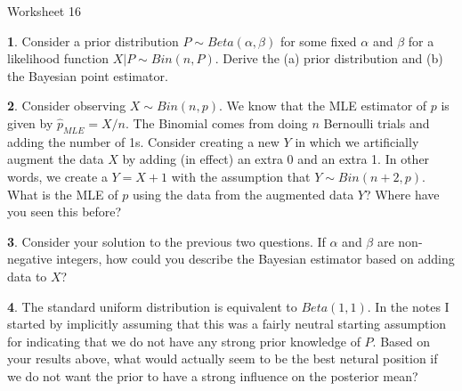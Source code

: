 \documentclass{tufte-handout}
\begin{document}
\justify

{\LARGE Worksheet 16}

\vspace*{18pt}


\textbf{1}. Consider a prior distribution $P \sim Beta(\alpha, \beta)$ for some fixed
$\alpha$ and $\beta$ for a likelihood function $X|P \sim Bin(n, P)$. Derive
the (a) prior distribution and (b) the Bayesian point estimator.

\textbf{2}. Consider observing $X \sim Bin(n, p)$. We know that the MLE estimator of $p$ is
given by $\hat{p}_{MLE} = X / n$. The Binomial comes from doing $n$ Bernoulli
trials and adding the number of 1s. Consider creating a new $Y$ in which we 
artificially augment the data $X$ by adding (in effect) an extra 0 and an extra
1. In other words, we create a $Y = X + 1$ with the assumption that
$Y \sim Bin(n+2, p)$. What is the MLE of $p$ using the data from the augmented
data $Y$? Where have you seen this before?

\textbf{3}. Consider your solution to the previous two questions. If $\alpha$ and $\beta$
are non-negative integers, how could you describe the Bayesian estimator based
on adding data to $X$? 

\textbf{4}. The standard uniform distribution is equivalent to $Beta(1,1)$. In the notes
I started by implicitly assuming that this was a fairly neutral starting
assumption for indicating that we do not have any strong prior knowledge of
$P$. Based on your results above, what would actually seem to be the best
netural position if we do not want the prior to have a strong influence on 
the posterior mean?
\end{document}
